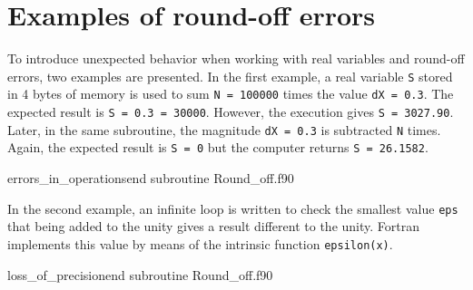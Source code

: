     \newpage    
    \section{Examples of round-off errors} 
    
To introduce unexpected behavior when working with real variables and round-off errors, 
two examples are presented.   
In the first example, a real variable \texttt{S} stored in 4 bytes of memory is used to sum \texttt{N = 100000}
times the value \texttt{dX = 0.3}. The expected result is \texttt{S = 0.3  = 30000}. 
However, the execution gives \texttt{S = 3027.90}. Later, in the same subroutine, the magnitude   
\texttt{dX = 0.3} is subtracted \texttt{N} times. Again, the expected result is  \texttt{S = 0}
but the computer returns \texttt{S = 26.1582}.

\vspace{0.5cm}
{errors_in_operations}{end subroutine}
{Round_off.f90} 

\newpage
In the second example, an infinite loop is written to check the smallest value \texttt{eps} 
that being added to the unity gives a result different to the unity.  
Fortran implements this value by means of the intrinsic function \texttt{epsilon(x)}.

\vspace{0.5cm}  
{loss_of_precision}{end subroutine}
{Round_off.f90} 


